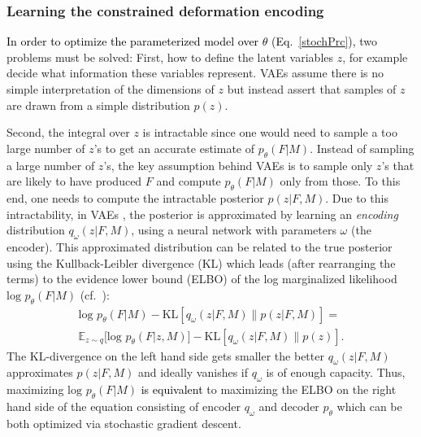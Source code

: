 \documentclass[journal]{IEEEtran}
\newcommand{\update}[1]{\textcolor{black}{#1}}
\begin{document}
\subsubsection{Learning the constrained deformation encoding}
\update{In order to optimize the parameterized model over $\theta$ (Eq.~\ref{stochPrc}),} two problems must be solved: First, how to define the latent variables $z$, for example decide what information these variables represent. VAEs assume there is no simple interpretation of the dimensions of $z$ but instead assert that samples of $z$ are drawn from a simple distribution $p(z)$. 

Second, the integral over $z$ is intractable since one would need to sample a too large number of $z$'s to get an accurate estimate of $p_\theta(F|M)$. Instead of sampling a large number of $z$'s, the key assumption behind VAEs is to sample only $z$'s that are likely to have produced $F$ and compute $p_\theta(F|M)$ only from those. To this end, one needs to compute the intractable posterior $p(z|F,M)$. Due to this intractability, in VAEs \cite{kingma2013auto}, the posterior is approximated by learning an \emph{encoding} distribution $q_\omega(z|F,M)$, using a neural network with parameters $\omega$ (the encoder). This approximated distribution can be related to the true posterior using the Kullback-Leibler divergence (KL) which leads (after rearranging the terms) to the evidence lower bound (ELBO) of the log marginalized likelihood $\text{log } p_\theta(F|M)$ (cf.~\cite{kingma2013auto,kingma2014semi}):
\begin{multline}\label{objective}
\text{log } p_\theta(F|M) - \text{KL}\left[q_\omega(z|F,M)\| p(z|F,M) \right] = \\ 
\mathbb{E}_{z\sim q}\Big[\text{log } p_\theta(F|z,M) \Big] - \text{KL}\left[q_\omega(z|F,M)\| p(z) \right].
\end{multline}
The KL-divergence on the left hand side gets smaller the better $q_\omega(z|F,M)$ approximates $p(z|F,M)$ and ideally vanishes if $q_\omega$ is of enough capacity. Thus, maximizing $\text{log } p_\theta(F|M)$ \update{is equivalent} to maximizing the ELBO on the right hand side of the equation consisting of encoder $q_\omega$ and decoder $p_\theta$ which can be both optimized via stochastic gradient descent.
\end{document}
